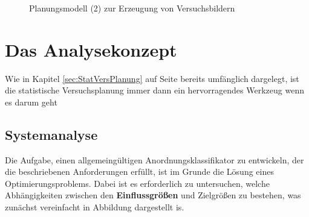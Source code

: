 \documentclass[
fontsize=10pt, 
listof = totoc,
parskip = half	
]{report}
\begin{document}
\begin{figure}[H]
	\caption{Planungsmodell (2) zur Erzeugung von Versuchsbildern}
	\label{fig:Planungsmodell(2)}
\end{figure}


\section{Das Analysekonzept}

Wie in Kapitel \ref{sec:StatVersPlanung} auf Seite \pageref{sec:StatVersPlanung} bereits umfänglich dargelegt, ist die statistische Versuchsplanung immer dann ein hervorragendes Werkzeug wenn es darum geht


\subsection{Systemanalyse}
Die Aufgabe, einen allgemeingültigen Anordnungsklassifikator zu entwickeln, der die beschriebenen Anforderungen erfüllt, ist im Grunde die Lösung eines Optimierungsproblems. Dabei ist es erforderlich zu untersuchen, welche Abhängigkeiten zwischen den \textbf{Einflussgrößen} und Zielgrößen zu bestehen, was zunächst vereinfacht in Abbildung dargestellt is.
       
\end{document}
